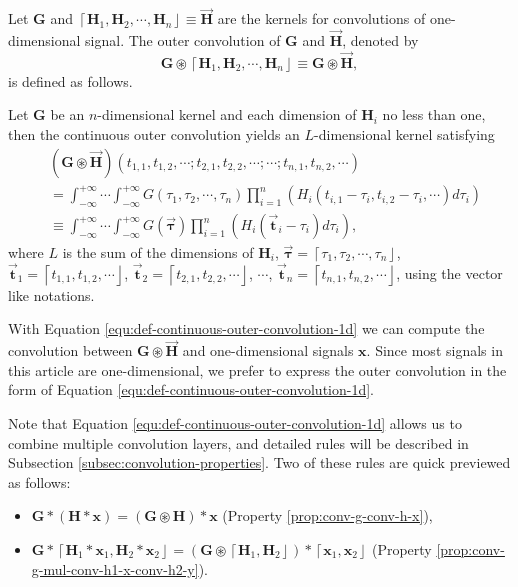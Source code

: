 \documentclass[twoside,11pt]{article}
\def\oconv{\circledast}
\def\tvar#1{\mathbf{#1}} %
\def\vsymb#1{\vec{\mathbf{#1}}}
\def\isintinf{\int_{-\infty}^{+\infty}\!\!\!\cdots\!\int_{-\infty}^{+\infty}\!}
\def\lcerfl#1{\left\lceil{#1}\right\rfloor}
\begin{document}
Let \(\tvar{G}\) and \(\lcerfl{\tvar{H}_1, \tvar{H}_2, \cdots, \tvar{H}_n} \equiv \vsymb{H}\) are the kernels for convolutions of one-dimensional signal. The outer convolution of $\tvar{G}$ and $\vsymb{H}$, denoted by
\begin{equation}
  \tvar{G} \oconv \lcerfl{\tvar{H}_1, \tvar{H}_2, \cdots, \tvar{H}_n} \equiv \tvar{G} \oconv \vsymb{H},
  \label{equ:def-outer-convolution}
\end{equation}
is defined as follows.


\begin{definition}
  Let \(\tvar{G}\) be an \(n\)-dimensional kernel and each dimension of \(\tvar{H}_i\) no less than one, then the continuous outer convolution yields an $L$-dimensional kernel satisfying
  \begin{equation}
    \begin{aligned}
       & \left(\tvar{G} \oconv \vsymb{H}\right)(t_{1,1}, t_{1,2}, \cdots; t_{2,1}, t_{2,2}, \cdots; \cdots; t_{n,1}, t_{n,2}, \cdots)           \\
       & = \isintinf G(\tau_1, \tau_2, \cdots, \tau_n) \prod_{i=1}^{n} \left( H_i (t_{i,1} - \tau_i, t_{i,2} - \tau_i, \cdots) d \tau_i \right) \\
       & \equiv \isintinf G(\vsymb{\tau}) \prod_{i=1}^{n} \left(
      H_i (\vsymb{t}_i - \tau_i) d \tau_i
      \right),
    \end{aligned}
    \label{equ:def-continuous-outer-convolution-1d}
  \end{equation}
  where $L$ is the sum of the dimensions of $\tvar{H}_i$, \(\vsymb{\tau} = \lcerfl{\tau_1, \tau_2, \cdots, \tau_n}\),  \(\vsymb{t}_1 = \lcerfl{t_{1,1}, t_{1,2}, \cdots}\), \(\vsymb{t}_2 = \lcerfl{t_{2,1}, t_{2,2}, \cdots}\), \(\cdots\), \(\vsymb{t}_n = \lcerfl{t_{n,1}, t_{n,2}, \cdots}\), using the vector like notations.
  \label{def:outer-convolution}
\end{definition}

With Equation \ref{equ:def-continuous-outer-convolution-1d} we can compute the convolution between $\tvar{G} \oconv \vsymb{H}$ and one-dimensional signals $\tvar{x}$. Since most signals in this article are one-dimensional, we prefer to express the outer convolution in the form of Equation \ref{equ:def-continuous-outer-convolution-1d}.

Note that Equation \ref{equ:def-continuous-outer-convolution-1d} allows us to combine multiple convolution layers, and detailed rules will be described in Subsection \ref{subsec:convolution-properties}.
Two of these rules are quick previewed as follows:
\begin{itemize}
  \item \(\tvar{G} * (\tvar{H} * \tvar{x}) = (\tvar{G} \oconv \tvar{H}) * \tvar{x}\) (Property \ref{prop:conv-g-conv-h-x}),
  \item \(\tvar{G} * \lcerfl{\tvar{H}_1 * \tvar{x}_{1}, \tvar{H}_2 * \tvar{x}_2} = (\tvar{G} \oconv \lcerfl{\tvar{H}_1, \tvar{H}_2}) * \lcerfl{\tvar{x}_1, \tvar{x}_2}\) (Property \ref{prop:conv-g-mul-conv-h1-x-conv-h2-y}).
\end{itemize}
\end{document}
